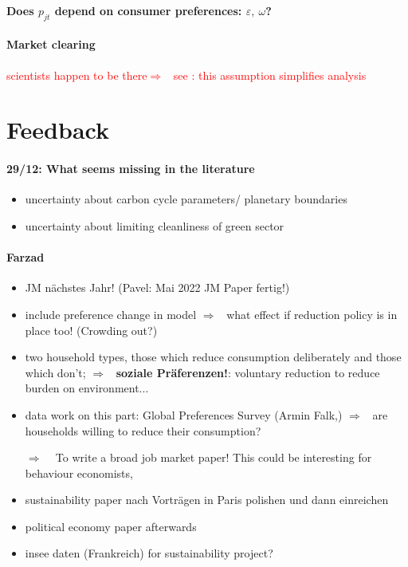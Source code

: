 \documentclass[12pt]{article}
\newcommand{\ar}{$\Rightarrow$ \ }
\newcommand{\tr}[1]{\textcolor{red}{#1}}
\begin{document}
\textbf{Does $p_{jt}$ depend on consumer preferences: $\varepsilon,\ \omega$?}

\paragraph{Market clearing}
\tr{scientists happen to be there\ar see  \cite{Acemoglu2002DirectedChange}: this assumption simplifies analysis }


\section{Feedback}
\paragraph{29/12: What seems missing in the literature}
\begin{itemize}
\item uncertainty about carbon cycle parameters/ planetary boundaries
\item uncertainty about limiting cleanliness of green sector
\end{itemize}
\paragraph{Farzad}
\begin{itemize}
\item JM nächstes Jahr! (Pavel: Mai 2022 JM Paper fertig!)
\item include preference change in model \ar what effect if reduction policy is in place too!  (Crowding out?)
\item two household types, those which reduce consumption deliberately and those which don't; \ar \textbf{soziale Präferenzen!}: voluntary reduction to reduce burden on environment...
\item data work on this part: Global Preferences Survey (Armin Falk,) \ar are households willing to reduce their consumption?
\item[\ar] To write a broad job market paper! This could be interesting for behaviour economists, 
\item sustainability paper nach Vorträgen in Paris polishen und dann einreichen
\item  political economy paper afterwards
\item insee daten (Frankreich) for sustainability project?
\end{itemize}
\clearpage

\end{document}
